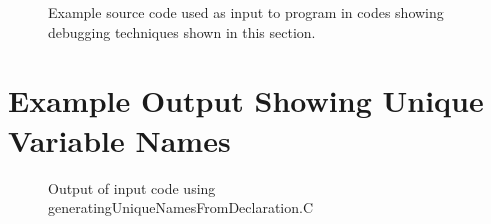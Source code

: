\begin{figure}[!h]
{\indent
{\mySmallFontSize

\begin{latexonly}
   
\end{latexonly}

\begin{htmlonly}
   
\end{htmlonly}

}
}
\caption{Example source code used as input to program in
         codes showing debugging techniques shown in this section.}
\label{Tutorial:exampleInputCode_UniqueVariableNameGeneration}
\end{figure}






\section{Example Output Showing Unique Variable Names}

\begin{figure}[!h]
{\indent
{\mySmallestFontSize

\begin{latexonly}
   
\end{latexonly}

\begin{htmlonly}
   
\end{htmlonly}

}
}
\caption{Output of input code using generatingUniqueNamesFromDeclaration.C}
\label{Tutorial:exampleOutput_UniqueVariableNameGeneration}
\end{figure}


